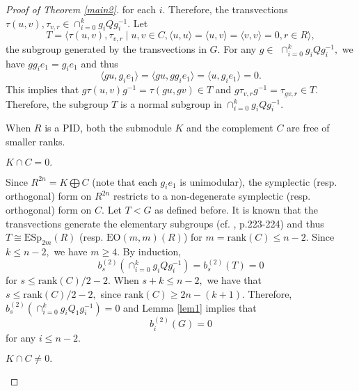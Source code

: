 \documentclass{gtpart}     %
\begin{document}
\begin{proof}[Proof of Theorem \protect\ref{main2}]
for each $i.$ Therefore, the transvections $\tau (u,v),\tau _{v,r}\in \cap
_{i=0}^{k}g_{i}Qg_{i}^{-1}.$ Let
\begin{equation*}
T=\langle \tau (u,v),\tau _{v,r}\mid u,v\in C,\langle u,u\rangle =\langle
u,v\rangle =\langle v,v\rangle =0,r\in R\rangle ,
\end{equation*}%
the subgroup generated by the transvections in $G.$ For any $g\in $ $\cap
_{i=0}^{k}g_{i}Qg_{i}^{-1},$ we have $gg_{i}e_{1}=g_{i}e_{1}$ and thus
\begin{equation*}
\langle gu,g_{i}e_{1}\rangle =\langle gu,gg_{i}e_{1}\rangle =\langle
u,g_{i}e_{1}\rangle =0.
\end{equation*}%
This implies that $g\tau (u,v)g^{-1}=\tau (gu,gv)\in T$ and $g\tau
_{v,r}g^{-1}=\tau _{gv,r}\in T.$ Therefore, the subgroup $T$ is a normal
subgroup in $\cap _{i=0}^{k}g_{i}Qg_{i}^{-1}.$

When $R$ is a PID, both the submodule $K$ and the complement $C$ are free of
smaller ranks.

\begin{description}
\item[Case (i)] $K\cap C=0.$

\item Since $R^{2n}=K\bigoplus C$ (note that each $g_{i}e_{1}$ is
unimodular), the symplectic (resp. orthogonal) form on $R^{2n}$ restricts to
a non-degenerate symplectic (resp. orthogonal) form on $C.$ Let $T<G$ as
defined before. It is known that the transvections generate the elementary
subgroups (cf. \cite{M}, p.223-224) and thus $T\cong \mathrm{ESp}_{2m}(R)$
(resp. $\mathrm{EO}(m,m)(R)$) for $m=\mathrm{rank}(C)\leq n-2.$ Since $k\leq
n-2,$ we have $m\geq 4.$ By induction,
\begin{equation*}
b_{s}^{(2)}(\cap _{i=0}^{k}g_{i}Qg_{i}^{-1})=b_{s}^{(2)}(T)=0
\end{equation*}%
for $s\leq \mathrm{rank}(C)/2-2.$ When $s+k\leq n-2,$ we have that $s\leq
\mathrm{rank}(C)/2-2,$ since $\mathrm{rank}(C)\geq 2n-(k+1).$ Therefore, $%
b_{s}^{(2)}(\cap _{i=0}^{k}g_{i}Q_{1}g_{i}^{-1})=0$ and Lemma \ref{lem1}
implies that
\begin{equation*}
b_{i}^{(2)}(G)=0
\end{equation*}%
for any $i\leq n-2.$

\item[Case (ii)] $K\cap C\neq 0.$


\end{description}
\end{proof}
\end{document}

